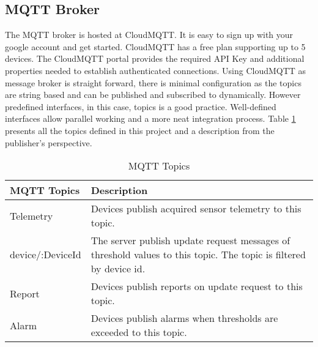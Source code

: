 \subsection{MQTT Broker}

The MQTT broker is hosted at CloudMQTT. It is easy to sign up with your google account and get started. CloudMQTT has a free plan supporting up to 5 devices. The CloudMQTT portal provides the required API Key and additional properties needed to establish authenticated connections. Using CloudMQTT as message broker is straight forward, there is minimal configuration as the topics are string based and can be published and subscribed to dynamically. However predefined interfaces, in this case, topics is a good practice. Well-defined interfaces allow parallel working and a more neat integration process. Table \ref{tbl:topics} presents all the topics defined in this project and a description from the publisher's perspective.

\begin{table}[H]
    \centering
    \begin{tabular}{|l|p{10cm}|}
    \hline
    \textbf{MQTT Topics}    & \textbf{Description} \\ \hline
    Telemetry & Devices publish acquired sensor telemetry to this topic. \\ \hline
    device/:DeviceId & The server publish update request messages of threshold values to this topic. The topic is filtered by device id. \\ \hline
    Report & Devices publish reports on update request to this topic. \\ \hline
    Alarm & Devices publish alarms when thresholds are exceeded to this topic. \\ \hline
    
    \end{tabular}
    \caption{MQTT Topics}
    \label{tbl:topics}
\end{table}
